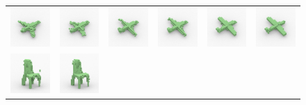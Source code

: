 \begin{figure}[t]
\setlength{\tabcolsep}{0pt}
\begin{tabular}{cccccc}
\includegraphics[width=.166\linewidth]{prgan/fig/interpolation/ap0.png} &
\includegraphics[width=.166\linewidth]{prgan/fig/interpolation/ap1.png} &
\includegraphics[width=.166\linewidth]{prgan/fig/interpolation/ap3.png} &
\includegraphics[width=.166\linewidth]{prgan/fig/interpolation/ap4.png} &
\includegraphics[width=.166\linewidth]{prgan/fig/interpolation/ap6.png} &
\includegraphics[width=.166\linewidth]{prgan/fig/interpolation/ap7.png} \\
\includegraphics[width=.166\linewidth]{prgan/fig/interpolation/ch0.png} &
\includegraphics[width=.166\linewidth]{prgan/fig/interpolation/ch3.png} &

\end{tabular}
\end{figure}
